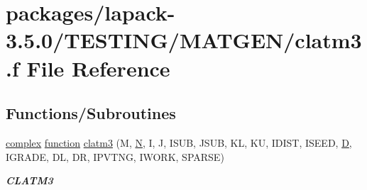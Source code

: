 \hypertarget{clatm3_8f}{}\section{packages/lapack-\/3.5.0/\+T\+E\+S\+T\+I\+N\+G/\+M\+A\+T\+G\+E\+N/clatm3.f File Reference}
\label{clatm3_8f}
\subsection*{Functions/\+Subroutines}
\begin{DoxyCompactItemize}
\item 
\hyperlink{structcomplex}{complex} \hyperlink{afunc_8m_a7b5e596df91eadea6c537c0825e894a7}{function} \hyperlink{group__complex__matgen_ga929f663f785e4b5841d06d9a947d670c}{clatm3} (M, \hyperlink{polmisc_8c_a0240ac851181b84ac374872dc5434ee4}{N}, I, J, I\+S\+U\+B, J\+S\+U\+B, K\+L, K\+U, I\+D\+I\+S\+T, I\+S\+E\+E\+D, \hyperlink{odrpack_8h_a7dae6ea403d00f3687f24a874e67d139}{D}, I\+G\+R\+A\+D\+E, D\+L, D\+R, I\+P\+V\+T\+N\+G, I\+W\+O\+R\+K, S\+P\+A\+R\+S\+E)
\begin{DoxyCompactList}\small\item\em {\bfseries C\+L\+A\+T\+M3} \end{DoxyCompactList}\end{DoxyCompactItemize}
